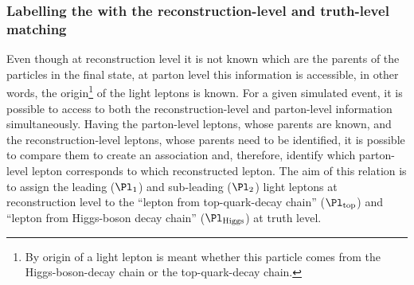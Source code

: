 \subsubsection{Labelling the \dilepSStau with the reconstruction-level and truth-level matching}
\label{sec:tHq:origin:LeptonAssignment_truth_reco_DeltaRCone}
Even though at reconstruction level it is not known which are the parents of the particles in the final 
state, at parton level this information is accessible, in other words, the origin\footnote{By origin of a 
light lepton is meant whether this particle comes from the Higgs-boson-decay chain or the top-quark-decay chain.}
 of the light leptons is known.
For a given simulated event, it is possible to access to both the reconstruction-level and parton-level information simultaneously.
Having the parton-level leptons, whose parents are known, and the reconstruction-level leptons, whose parents
need to be identified, it is possible to compare them to create an association and, therefore, identify which 
parton-level lepton corresponds to which reconstructed lepton.
The aim of this relation is to assign the leading ($\Pl_{1}$) and sub-leading ($\Pl_{2}$) light leptons at reconstruction level to
the ``lepton from top-quark-decay chain'' ($\Pl_{\text{top}}$) and ``lepton from Higgs-boson decay chain'' ($\Pl_{\text{Higgs}}$) 
at truth level. 

